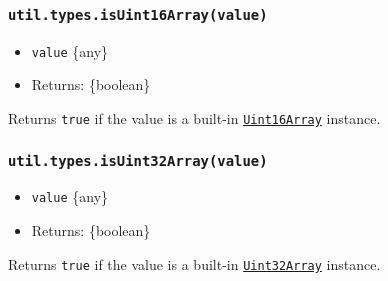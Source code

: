 \subsubsection{\texorpdfstring{\texttt{util.types.isUint16Array(value)}}{util.types.isUint16Array(value)}}\label{util.types.isuint16arrayvalue}

\begin{itemize}
\tightlist
\item
  \texttt{value} \{any\}
\item
  Returns: \{boolean\}
\end{itemize}

Returns \texttt{true} if the value is a built-in
\href{https://developer.mozilla.org/en-US/docs/Web/JavaScript/Reference/Global_Objects/Uint16Array}{\texttt{Uint16Array}}
instance.

\begin{Shaded}
\begin{Highlighting}[]
\NormalTok{(} \NormalTok{())}\OperatorTok{;}  
\NormalTok{(} \NormalTok{())}\OperatorTok{;}  
\NormalTok{(} \NormalTok{())}\OperatorTok{;}  
\end{Highlighting}
\end{Shaded}

\subsubsection{\texorpdfstring{\texttt{util.types.isUint32Array(value)}}{util.types.isUint32Array(value)}}\label{util.types.isuint32arrayvalue}

\begin{itemize}
\tightlist
\item
  \texttt{value} \{any\}
\item
  Returns: \{boolean\}
\end{itemize}

Returns \texttt{true} if the value is a built-in
\href{https://developer.mozilla.org/en-US/docs/Web/JavaScript/Reference/Global_Objects/Uint32Array}{\texttt{Uint32Array}}
instance.

